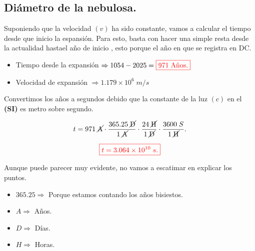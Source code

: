 \documentclass[a4paper,12pt]{article} %
\begin{document}
\vspace{\baselineskip}

\subsection{Diámetro de la nebulosa.}

\begin{justify}
    Suponiendo que la velocidad \((v)\) ha sido constante, vamos a calcular el tiempo desde que inicio la espansión.
    Para esto, basta con hacer una simple resta desde la actualidad hastael año de inicio , esto porque el año en que se registra en DC.
\end{justify}

\begin{itemize}
    \item Tiempo desde la expansión \( \Rightarrow 1054 - 2025 = \textcolor{red}{\boxed{971 \; \text{Años.}}} \)
    \item Velocidad de expansión \( \Rightarrow 1.179 \times 10^6 \; m/s \)
\end{itemize}

\begin{justify}
    Convertimos los años a segundos debido que la constante de la luz \((c)\) en el \textbf{(SI)} es metro sobre segundo.
\end{justify}

\[ t = 971 \; \cancel{\text{A}} \cdot \frac{365.25 \; \cancel{\text{D}}}{1 \; \cancel{\text{A}}} \cdot \frac{24 \; \cancel{\text{H}}}{1 \; \cancel{\text{D}}} \cdot \frac{3600 \; S}{1 \; \cancel{\text{H}}}. \]

\vspace{\baselineskip}

\[\textcolor{red}{\boxed{t = 3.064 \times 10^{10} \; s.}}\]

\begin{justify}
    Aunque puede parecer muy evidente, no vamos a escatimar en explicar los puntos.
\end{justify}

\begin{itemize}
    \item \( 365.25 \Rightarrow\) Porque estamos contando los años bisiestos.
    \item \( A \Rightarrow\) Años.
    \item \( D \Rightarrow\) Días.
    \item \( H \Rightarrow \) Horas.
\end{itemize}
\end{document}
